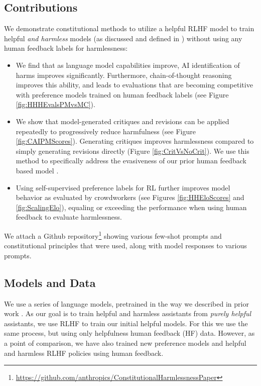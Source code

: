 \subsection{Contributions}

We demonstrate constitutional methods to utilize a helpful RLHF model to train helpful {\it and harmless} models (as discussed and defined in \cite{askell2021general, bai2022training}) without using any human feedback labels for harmlessness:

\begin{itemize}
    \item We find that as language model capabilities improve, AI identification of harms improves significantly.  Furthermore,  chain-of-thought reasoning improves this ability, and leads to evaluations that are becoming competitive with preference models trained on human feedback labels (see Figure \ref{fig:HHHEvalsPMvsMC}).
    \item We show that model-generated critiques and revisions can be applied repeatedly to progressively reduce harmfulness (see Figure \ref{fig:CAIPMScores}). Generating critiques improves harmlessness compared to simply generating revisions directly (Figure \ref{fig:CritVsNoCrit}). We use this method to specifically address the evasiveness of our prior human feedback based model \cite{bai2022training}.
    \item Using  self-supervised preference labels for RL further improves model behavior as evaluated by crowdworkers (see Figures \ref{fig:HHEloScores} and \ref{fig:ScalingElo}), equaling or exceeding the performance when using human feedback to evaluate harmlessness.  
\end{itemize}

We attach a Github repository\footnote{\url{https://github.com/anthropics/ConstitutionalHarmlessnessPaper}} showing various few-shot prompts and constitutional principles that were used, along with model responses to various prompts. 

\subsection{Models and Data}

We use a series of language models, pretrained in the way we described in prior work \cite{bai2022training}.  As our goal is to train helpful and harmless assistants from {\it purely helpful} assistants, we use RLHF to train our initial helpful models. For this we use the same process, but using only helpfulness human feedback (HF) data.   However, as a point of comparison, we have also trained new preference models and helpful and harmless RLHF policies using human feedback.

